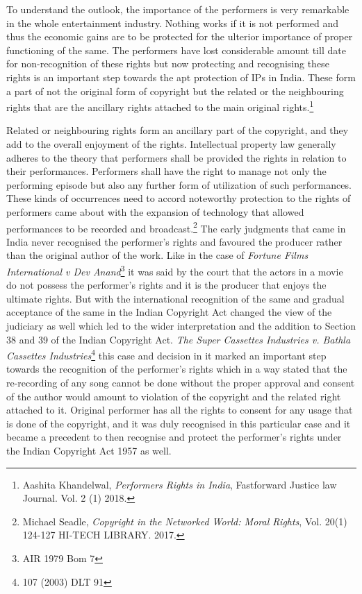 \begin{multicols}{2}
\noi
To understand the outlook, the importance of the performers is very remarkable in the whole
entertainment industry. Nothing works if it is not performed and thus the economic gains are
to be protected for the ulterior importance of proper functioning of the same. The performers
have lost considerable amount till date for non-recognition of these rights but now protecting
and recognising these rights is an important step towards the apt protection of IPs in India.
These form a part of not the original form of copyright but the related or the neighbouring
rights that are the ancillary rights attached to the main original rights.\footnote{Aashita Khandelwal, \textit{Performers Rights in India}, Fastforward Justice law Journal. Vol. 2 (1) 2018.}


\noi
Related or neighbouring rights form an ancillary part of the copyright, and they add to the
overall enjoyment of the rights. Intellectual property law generally adheres to the theory that
performers shall be provided the rights in relation to their performances. Performers shall
have the right to manage not only the performing episode but also any further form of
utilization of such performances. These kinds of occurrences need to accord noteworthy
protection to the rights of performers came about with the expansion of technology that
allowed performances to be recorded and broadcast.\footnote{Michael Seadle, \textit{Copyright in the Networked World: Moral Rights}, Vol. 20(1) 124-127 HI-TECH LIBRARY.
2017.}
 The early judgments that came in India
never recognised the performer’s rights and favoured the producer rather than the original
author of the work. Like in the case of \textit{Fortune Films International v Dev Anand}\footnote{AIR 1979 Bom 7}
 it was said
by the court that the actors in a movie do not possess the performer’s rights and it is the
producer that enjoys the ultimate rights. But with the international recognition of the same
and gradual acceptance of the same in the Indian Copyright Act changed the view of the
judiciary as well which led to the wider interpretation and the addition to Section 38 and 39
of the Indian Copyright Act. \textit{The Super Cassettes Industries v. Bathla Cassettes Industries}\footnote{107 (2003) DLT 91}
this case and decision in it marked an important step towards the recognition of the
performer’s rights which in a way stated that the re-recording of any song cannot be done
without the proper approval and consent of the author would amount to violation of the
copyright and the related right attached to it. Original performer has all the rights to consent
for any usage that is done of the copyright, and it was duly recognised in this particular case
and it became a precedent to then recognise and protect the performer’s rights under the
Indian Copyright Act 1957 as well.


\end{multicols}
